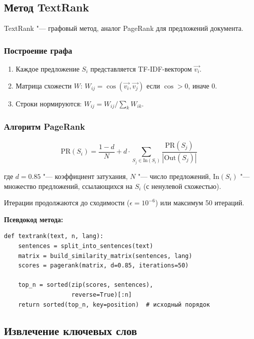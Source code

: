 \subsection{Метод TextRank}

TextRank "--- графовый метод, аналог PageRank для предложений документа.

\subsubsection{Построение графа}

\begin{enumerate}
	\item Каждое предложение $S_i$ представляется TF-IDF-вектором $\vec{v_i}$.
	\item Матрица схожести $W$: $W_{ij} = \cos(\vec{v_i}, \vec{v_j})$ если $\cos > 0$, иначе $0$.
	\item Строки нормируются: $W_{ij} = W_{ij} / \sum_k W_{ik}$.
\end{enumerate}

\subsubsection{Алгоритм PageRank}

\begin{equation}
	\text{PR}(S_i) = \frac{1 - d}{N} + d \cdot \sum_{S_j \in \text{In}(S_i)} \frac{\text{PR}(S_j)}{|\text{Out}(S_j)|}
	\label{eq:pagerank}
\end{equation}

где $d = 0.85$ "--- коэффициент затухания, $N$ "--- число предложений,
$\text{In}(S_i)$ "--- множество предложений, ссылающихся на $S_i$ (с ненулевой схожестью).

Итерации продолжаются до сходимости ($\epsilon = 10^{-6}$) или максимум 50 итераций.

\textbf{Псевдокод метода:}

\begin{lstlisting}[caption={Алгоритм TextRank.},label={lst:textrank_algo}]
def textrank(text, n, lang):
    sentences = split_into_sentences(text)
    matrix = build_similarity_matrix(sentences, lang)
    scores = pagerank(matrix, d=0.85, iterations=50)

    top_n = sorted(zip(scores, sentences),
                   reverse=True)[:n]
    return sorted(top_n, key=position)  # исходный порядок
\end{lstlisting}

\subsection{Извлечение ключевых слов}

